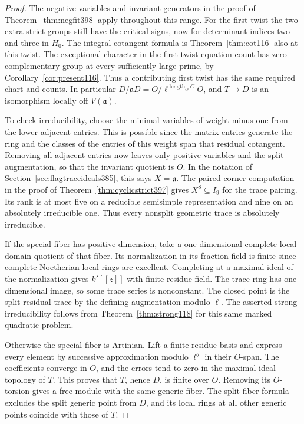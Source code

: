 \documentclass[a4paper,11pt]{article}
\theoremstyle{definition}
\theoremstyle{remark}
\numberwithin{equation}{section}
\begin{document}
\begin{proof}
The negative variables and invariant generators in the proof of
Theorem~\ref{thm:negfit398} apply throughout this range. For the
first twist the two extra strict groups still have the critical
signs, now for determinant indices two and three in \(H_0\).
The integral cotangent formula is Theorem~\ref{thm:cot116} also
at this twist. The exceptional character in the first-twist
equation count has zero complementary group at every sufficiently
large prime, by Corollary~\ref{cor:present116}. Thus a contributing
first twist has the same required chart and counts. In particular
\(D/\mathfrak aD=O/\ell^{\operatorname{length}_O C}O\), and
\(T\to D\) is an isomorphism locally off \(V(\mathfrak a)\).

To check irreducibility, choose the minimal variables of weight
minus one from the lower adjacent entries. This is possible since
the matrix entries generate the ring and the classes of the
entries of this weight span that residual cotangent. Removing
all adjacent entries now leaves only positive variables and the
split augmentation, so that the invariant quotient is \(O\).
In the notation of Section~\ref{sec:flagtraceideals385}, this
says \(X=\mathfrak a\). The paired-corner computation in the proof
of Theorem~\ref{thm:cyclicstrict397} gives \(X^8\subseteq I_9\)
for the trace pairing. Its rank is at most five on a reducible
semisimple representation and nine on an absolutely irreducible
one. Thus every nonsplit geometric trace is absolutely irreducible.

If the special fiber has positive dimension, take a one-dimensional
complete local domain quotient of that fiber. Its normalization
in its fraction field is finite since complete Noetherian local
rings are excellent. Completing at a maximal ideal of the
normalization gives \(k'[[z]]\) with finite residue field. The
trace ring has one-dimensional image, so some trace series is
nonconstant. The closed point is the split residual trace by
the defining augmentation modulo \(\ell\). The asserted strong
irreducibility follows from Theorem~\ref{thm:strong118} for
this same marked quadratic problem.

Otherwise the special fiber is Artinian. Lift a finite residue
basis and express every element by successive approximation
modulo \(\ell^j\) in their \(O\)-span. The coefficients converge
in \(O\), and the errors tend to zero in the maximal ideal topology
of \(T\). This proves that \(T\), hence \(D\), is finite over
\(O\). Removing its \(O\)-torsion gives a free module with the
same generic fiber. The split fiber formula excludes the split
generic point from \(D\), and its local rings at all other
generic points coincide with those of \(T\).


\end{proof}
\end{document}
